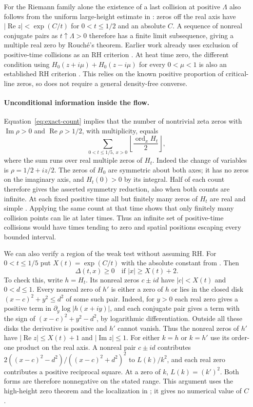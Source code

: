 \documentclass[11pt,a4paper]{article}
\numberwithin{equation}{section}
\renewcommand{\Re}{\operatorname{Re}}\renewcommand{\Im}{\operatorname{Im}}
\begin{document}
For the Riemann family alone the existence of a last collision at
positive $\Lambda$ also follows from the uniform large-height
estimate in \cite[Theorem~1.5]{Poly}: zeros off the real axis have
$|\Re z|<\exp(C/t)$ for $0<t\le1/2$ and an absolute $C$.
A sequence of nonreal conjugate pairs as $t\uparrow\Lambda>0$
therefore has a finite limit subsequence, giving a multiple real
zero by Rouch\'e's theorem. Earlier work already uses exclusion of
positive-time collisions as an RH criterion \cite{Fathi}. At heat
time zero, the different condition using
$H_0(z+i\mu)+H_0(z-i\mu)$ for every $0<\mu<1$ is also an
established RH criterion \cite[Theorem~4.1, phase zero]{CSV}.
This relies on the known positive proportion of critical-line zeros,
so does not require a general density-free converse.

\paragraph{Unconditional information inside the flow.}
Equation~\eqref{eq:exact-count} implies that the number of nontrivial
zeta zeros with $\Im\rho>0$ and $\Re\rho>1/2$, with multiplicity,
equals
\[
       \sum_{0<t\le1/5,\ x>0}
                  \left\lfloor\frac{\operatorname{ord}_x H_t}{2}
                         \right\rfloor ,
\]
where the sum runs over real multiple zeros of $H_t$. Indeed the
change of variables is $\rho=1/2+iz/2$. The zeros of $H_0$ are
symmetric about both axes; it has no zeros on the imaginary axis,
and $H_t(0)>0$ by its integral. Half of each count therefore gives
the asserted symmetry reduction, also when both counts are infinite.
At each fixed positive time all but finitely many zeros of $H_t$
are real and simple \cite{KKL}. Applying the same count at that time
shows that only finitely many collision points can lie at later times.
Thus an infinite set of positive-time collisions would have times
tending to zero and spatial positions escaping every bounded interval.

We can also verify a region of the weak test without assuming RH.
For $0<t\le1/5$ put $X(t)=\exp(C/t)$ with the absolute constant from
\cite[Theorem~1.5]{Poly}. Then
\[
              \Delta(t,x)\ge0\quad\text{if } |x|\ge X(t)+2 .
\]
To check this, write $h=H_t$. Its nonreal zeros $c\pm id$ have
$|c|<X(t)$ and $0<d\le1$. Every nonreal zero of $h'$ is either a
zero of $h$ or lies in the closed disk $(x-c)^2+y^2\le d^2$ of
some such pair. Indeed, for $y>0$ each real zero gives a positive
term in $\partial_y\log|h(x+iy)|$, and each conjugate pair gives a
term with the sign of $(x-c)^2+y^2-d^2$, by logarithmic differentiation.
Outside all these disks the derivative is positive and $h'$ cannot
vanish. Thus the nonreal zeros of $h'$ have $|\Re z|\le X(t)+1$
and $|\Im z|\le1$. For either $k=h$ or $k=h'$ use its order-one
product on the real axis. A nonreal pair $c\pm id$ contributes
$2((x-c)^2-d^2)/((x-c)^2+d^2)^2$ to $L(k)/k^2$, and each real
zero contributes a positive reciprocal square. At a zero of $k$,
$L(k)=(k')^2$. Both forms are therefore nonnegative on the stated
range. This argument uses the high-height zero theorem and the
localization in \cite[Proposition~2.2]{Cs14}; it gives no numerical
value of $C$.
\end{document}
